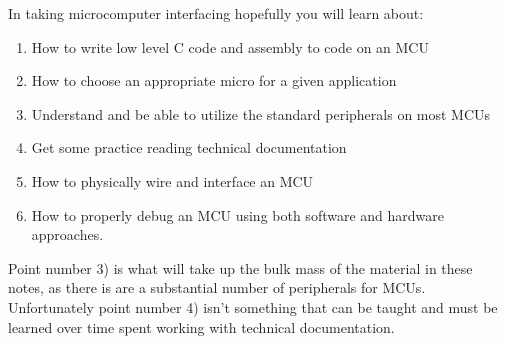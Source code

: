 \documentclass[10pt]{article}
\begin{document}
In taking microcomputer interfacing hopefully you will learn about:
\begin{enumerate}
\item How to write low level C code and assembly to code on an MCU
\item How to choose an appropriate micro for a given application
\item Understand and be able to utilize the standard peripherals on most MCUs
\item Get some practice reading technical documentation
\item How to physically wire and interface an MCU
\item How to properly debug an MCU using both software and hardware approaches.
\end{enumerate}
Point number 3) is what will take up the bulk mass of the material in these notes, as there is are a substantial number of peripherals for MCUs.\\

Unfortunately point number 4) isn't something that can be taught and must be learned over time spent working with technical documentation.
\end{document}
